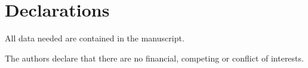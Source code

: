 \documentclass{amsart}
\begin{document}
\section*{Declarations}

 All data needed are contained in the manuscript.

\medskip
{} The authors declare that there are no financial, competing or conflict of interests.





\end{document}
